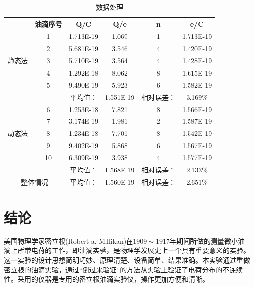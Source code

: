\documentclass[10pt,a4paper,twocolumn,twoside,UTF8]{ctexart}
\begin{document}
	\begin{table}[htbp]
	  \centering

	    \begin{tabular}{c|ccccc}
	    \toprule
	    \multicolumn{1}{c}{} & 油滴序号  & Q/C   & Q/e   & n     & e/C \\
	    \midrule
	    \multicolumn{1}{c}{\multirow{5}[2]{*}{静态法}} & 1     & 1.713E-19 & 1.069  & 1     & 1.713E-19 \\
	    \multicolumn{1}{c}{} & 2     & 5.681E-19 & 3.546  & 4     & 1.420E-19 \\
	    \multicolumn{1}{c}{} & 3     & 5.710E-19 & 3.564  & 4     & 1.428E-19 \\
	    \multicolumn{1}{c}{} & 4     & 1.292E-18 & 8.062  & 8     & 1.615E-19 \\
	    \multicolumn{1}{c}{} & 5     & 9.490E-19 & 5.923  & 6     & 1.582E-19 \\
	    \midrule
	    \multicolumn{1}{c}{} &       & 平均值：  & 1.551E-19 & 相对误差： & 3.169\% \\
	    \midrule
	    \multicolumn{1}{c}{\multirow{5}[2]{*}{动态法}} & 6     & 1.253E-18 & 7.821  & 8     & 1.566E-19 \\
	    \multicolumn{1}{c}{} & 7     & 3.174E-19 & 1.981  & 2     & 1.587E-19 \\
	    \multicolumn{1}{c}{} & 8     & 1.234E-18 & 7.701  & 8     & 1.542E-19 \\
	    \multicolumn{1}{c}{} & 9     & 9.402E-19 & 5.868  & 6     & 1.567E-19 \\
	    \multicolumn{1}{c}{} & 10    & 6.309E-19 & 3.938  & 4     & 1.577E-19 \\
	    \midrule
	    \multicolumn{1}{c}{} &       & 平均值：  & 1.568E-19 & 相对误差： & 2.133\% \\
	    \multicolumn{2}{c}{整体情况} & 平均值：  & 1.560E-19 & 相对误差： & 2.651\% \\
	    \bottomrule
	    \end{tabular}%
	 \caption{数据处理}
	\end{table}%





\section{结论}
美国物理学家密立根(Robert a. Millikan)在$1909 \sim 1917$年期间所做的测量微小油滴上所带电荷的工作，即油滴实验，是物理学发展史上一个具有重要意义的实验。这一实验的设计思想简明巧妙、原理清楚、设备简单、结果准确。本实验通过重做密立根的油滴实验，通过“倒过来验证”的方法从实验上验证了电荷分布的不连续性。采用的仪器是专用的密立根油滴实验仪，操作更加方便和清晰。
\end{document}
